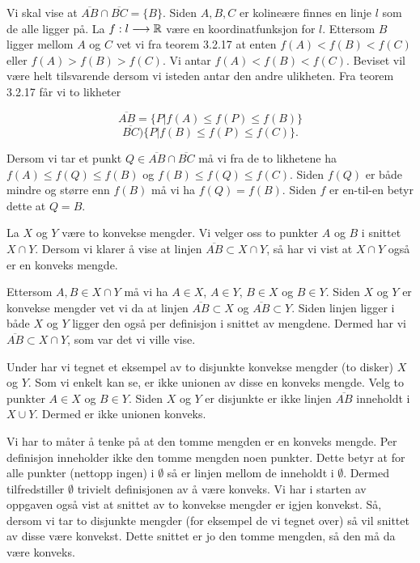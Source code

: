\begin{oppgave}[3.2.24.d)]
  Vi skal vise at $\overline{AB}\cap \overline{BC} = \{B\}$. Siden $A, B, C$ er kolineære finnes en 
  linje $l$ som de alle ligger på. La $f:l\longrightarrow \mathbb{R}$ være en koordinatfunksjon for $l$. 
  Ettersom $B$ ligger mellom $A$ og $C$ vet vi fra teorem 3.2.17 at enten $f(A)<f(B)<f(C)$ eller 
  $f(A)>f(B)>f(C)$. Vi antar $f(A)<f(B)<f(C)$. Beviset vil være helt tilsvarende dersom vi isteden
  antar den andre ulikheten. Fra teorem 3.2.17 får vi to likheter

  $$ \overline{AB}=\{P|f(A)\leq f(P)\leq f(B)\} $$
  $$ \overline{BC})\{P|f(B)\leq f(P)\leq f(C)\} .$$

  Dersom vi tar et punkt $Q\in \overline{AB}\cap \overline{BC}$ må vi fra de to likhetene ha
  $ f(A)\leq f(Q)\leq f(B)$ og $f(B)\leq f(Q)\leq f(C)$. Siden $f(Q)$ er både mindre og større enn 
  $f(B)$ må vi ha $f(Q)=f(B)$. Siden $f$ er en-til-en betyr dette at $Q=B$. 
\end{oppgave}

\begin{oppgave}[3.3.1]
  La $X$ og $Y$ være to konvekse mengder. Vi velger oss to punkter $A$ og $B$ i snittet $X\cap Y$. 
  Dersom vi klarer å vise at linjen $\overline{AB}\subset X\cap Y$, så har vi vist at $X\cap Y$ også 
  er en konveks mengde. 

  Ettersom $A, B\in X\cap Y$ må vi ha $A\in X$, $A\in Y$, $B\in X$ og $B\in Y$. Siden $X$ og $Y$ er 
  konvekse mengder vet vi da at linjen $\overline{AB}\subset X$ og $\overline{AB}\subset Y$. Siden 
  linjen ligger i både $X$ og $Y$ ligger den også per definisjon i snittet av mengdene. Dermed har 
  vi $\overline{AB}\subset X\cap Y$, som var det vi ville vise. 

  Under har vi tegnet et eksempel av to disjunkte konvekse mengder (to disker) $X$ og $Y$. Som vi 
  enkelt kan se, er ikke unionen av disse en konveks mengde. Velg to punkter $A\in X$ og $B\in Y$. 
  Siden $X$ og $Y$ er disjunkte er ikke linjen $\overline{AB}$ inneholdt i $X\cup Y$. Dermed er 
  ikke unionen konveks. 
  
  Vi har to måter å tenke på at den tomme mengden er en konveks mengde. Per definisjon inneholder 
  ikke den tomme mengden noen punkter. Dette betyr at for alle punkter (nettopp ingen) i $\emptyset$ 
  så er linjen mellom de inneholdt i $\emptyset$. Dermed tilfredstiller $\emptyset$ trivielt 
  definisjonen av å være konveks. Vi har i starten av oppgaven også vist at snittet av to konvekse 
  mengder er igjen konvekst. Så, dersom vi tar to disjunkte mengder (for eksempel de vi tegnet over)
  så vil snittet av disse være konvekst. Dette snittet er jo den tomme mengden, så den må da være 
  konveks. 
\end{oppgave}


